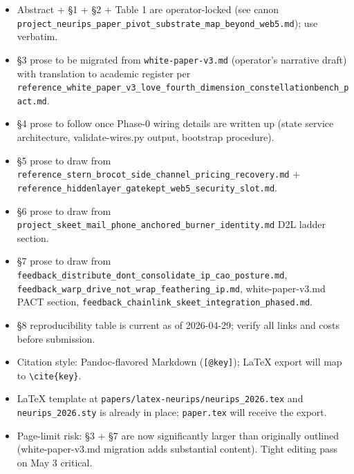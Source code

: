 \begin{itemize}
\tightlist
\item
  Abstract + §1 + §2 + Table 1 are operator-locked (see canon
  \texttt{project\_neurips\_paper\_pivot\_substrate\_map\_beyond\_web5.md});
  use verbatim.
\item
  §3 prose to be migrated from \texttt{white-paper-v3.md} (operator's
  narrative draft) with translation to academic register per
  \texttt{reference\_white\_paper\_v3\_love\_fourth\_dimension\_constellationbench\_pact.md}.
\item
  §4 prose to follow once Phase-0 wiring details are written up (state
  service architecture, validate-wires.py output, bootstrap procedure).
\item
  §5 prose to draw from
  \texttt{reference\_stern\_brocot\_side\_channel\_pricing\_recovery.md}
  + \texttt{reference\_hiddenlayer\_gatekept\_web5\_security\_slot.md}.
\item
  §6 prose to draw from
  \texttt{project\_skeet\_mail\_phone\_anchored\_burner\_identity.md}
  D2L ladder section.
\item
  §7 prose to draw from
  \texttt{feedback\_distribute\_dont\_consolidate\_ip\_cao\_posture.md},
  \texttt{feedback\_warp\_drive\_not\_wrap\_feathering\_ip.md},
  white-paper-v3.md PACT section,
  \texttt{feedback\_chainlink\_skeet\_integration\_phased.md}.
\item
  §8 reproducibility table is current as of 2026-04-29; verify all links
  and costs before submission.
\item
  Citation style: Pandoc-flavored Markdown (\texttt{{[}@key{]}}); LaTeX
  export will map to \texttt{\textbackslash{}cite\{key\}}.
\item
  LaTeX template at \texttt{papers/latex-neurips/neurips\_2026.tex} and
  \texttt{neurips\_2026.sty} is already in place; \texttt{paper.tex}
  will receive the export.
\item
  Page-limit risk: §3 + §7 are now significantly larger than originally
  outlined (white-paper-v3.md migration adds substantial content). Tight
  editing pass on May 3 critical.
\end{itemize}
